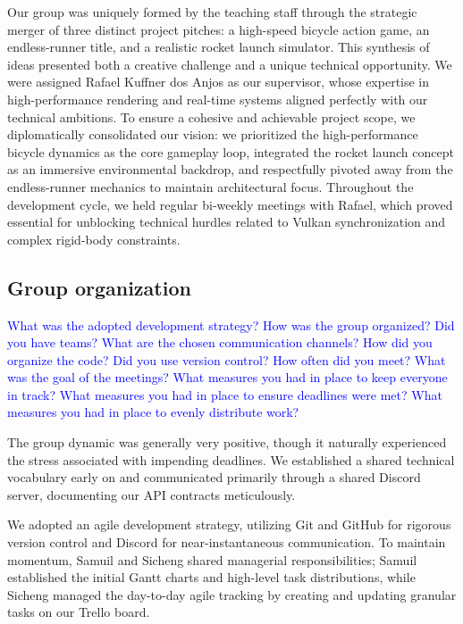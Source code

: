 \documentclass[acmtog, nonacm]{acmart}
\begin{document}
Our group was uniquely formed by the teaching staff through the strategic merger of three distinct project pitches: a high-speed bicycle action game, an endless-runner title, and a realistic rocket launch simulator. This synthesis of ideas presented both a creative challenge and a unique technical opportunity. We were assigned Rafael Kuffner dos Anjos as our supervisor, whose expertise in high-performance rendering and real-time systems aligned perfectly with our technical ambitions. To ensure a cohesive and achievable project scope, we diplomatically consolidated our vision: we prioritized the high-performance bicycle dynamics as the core gameplay loop, integrated the rocket launch concept as an immersive environmental backdrop, and respectfully pivoted away from the endless-runner mechanics to maintain architectural focus. Throughout the development cycle, we held regular bi-weekly meetings with Rafael, which proved essential for unblocking technical hurdles related to Vulkan synchronization and complex rigid-body constraints.

\subsection{Group organization}
\textcolor{blue}{What was the adopted development strategy?
How was the group organized? 
Did you have teams?
What are the chosen communication channels? 
How did you organize the code? 
Did you use version control? 
How often did you meet? 
What was the goal of the meetings? 
What measures you had in place to keep everyone in track?
What measures you had in place to ensure deadlines were met?
What measures you had in place to evenly distribute work?}

The group dynamic was generally very positive, though it naturally experienced the stress associated with impending deadlines. We established a shared technical vocabulary early on and communicated primarily through a shared Discord server, documenting our API contracts meticulously. 

We adopted an agile development strategy, utilizing Git and GitHub for rigorous version control and Discord for near-instantaneous communication. To maintain momentum, Samuil and Sicheng shared managerial responsibilities; Samuil established the initial Gantt charts and high-level task distributions, while Sicheng managed the day-to-day agile tracking by creating and updating granular tasks on our Trello board.
\end{document}

